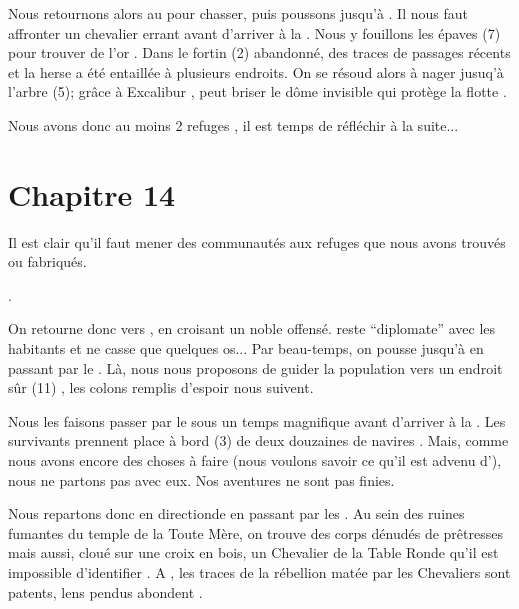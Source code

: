 \documentclass[11pt]{article}
\begin{document}
{Nous retournons alors au \bosquet{} pour chasser, puis poussons jusqu'à \blanc{}. Il nous faut affronter un chevalier errant avant d'arriver à la \flotte{}. Nous y fouillons les épaves (7) pour trouver de l'or . Dans le fortin (2) abandonné, des traces de passages récents et la herse a été entaillée à plusieurs endroits. On se résoud alors à nager jusuq'à l'arbre (5); grâce à Excalibur , \ailei{} peut briser le dôme invisible qui protège la flotte .

Nous avons donc au moins 2 refuges , il est temps de réfléchir à la suite...

\section{Chapitre 14}

Il est clair qu'il faut mener des communautés aux refuges que nous avons trouvés ou fabriqués.

.

On retourne donc vers \blanc{}, en croisant un noble offensé. \beor{} reste ``diplomate'' avec les habitants et ne casse que quelques os... Par beau-temps, on pousse jusqu'à \cuanachtdevaste{} en passant par le \bosquet{}. Là, nous nous proposons de guider la population vers un endroit sûr (11) , les colons remplis d'espoir  nous suivent.

Nous les faisons passer par le \premierfort{} sous un temps magnifique avant d'arriver à la \flotte{}. Les survivants prennent place à bord (3) de deux douzaines de navires . Mais, comme nous avons encore des choses à faire (nous voulons savoir ce qu'il est advenu d'\arthur{}), nous ne partons pas avec eux. Nos aventures ne sont pas finies.


Nous repartons donc en directionde \camelot{} en passant par les \marchestitan{}. Au sein des ruines fumantes du temple de la Toute Mère, on trouve des corps dénudés de prêtresses mais aussi, cloué sur une croix en bois, un Chevalier de la Table Ronde qu'il est impossible d'identifier . A \bourgpacif{}, les traces de la rébellion matée par les Chevaliers sont patents, lens pendus abondent .

}
\end{document}
